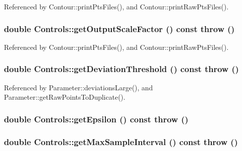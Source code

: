 Referenced by Contour::printPtsFiles(), and Contour::printRawPtsFiles().\hypertarget{classControls_04ccfec20fdc596a900c95088f364fa8}{
\subsubsection[getOutputScaleFactor]{\setlength{\rightskip}{0pt plus 5cm}double Controls::getOutputScaleFactor () const  throw ()}}
\label{classControls_04ccfec20fdc596a900c95088f364fa8}




Referenced by Contour::printPtsFiles(), and Contour::printRawPtsFiles().\hypertarget{classControls_fc84e06f47e14332d587027d319f8fee}{
\subsubsection[getDeviationThreshold]{\setlength{\rightskip}{0pt plus 5cm}double Controls::getDeviationThreshold () const  throw ()}}
\label{classControls_fc84e06f47e14332d587027d319f8fee}




Referenced by Parameter::deviationsLarge(), and Parameter::getRawPointsToDuplicate().\hypertarget{classControls_3d5b9e235d3459dfc1e2af8e02cd7b64}{
\subsubsection[getEpsilon]{\setlength{\rightskip}{0pt plus 5cm}double Controls::getEpsilon () const  throw ()}}
\label{classControls_3d5b9e235d3459dfc1e2af8e02cd7b64}


\hypertarget{classControls_98f1837fca9b50d4cee7fa8b2c296572}{
\subsubsection[getMaxSampleInterval]{\setlength{\rightskip}{0pt plus 5cm}double Controls::getMaxSampleInterval () const  throw ()}}
\label{classControls_98f1837fca9b50d4cee7fa8b2c296572}


